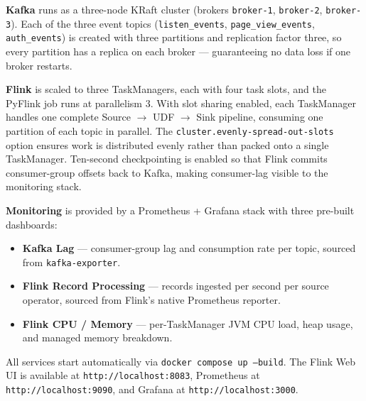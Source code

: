 \textbf{Kafka} runs as a three-node KRaft cluster (brokers \texttt{broker-1},
\texttt{broker-2}, \texttt{broker-3}).
Each of the three event topics (\texttt{listen\_events}, \texttt{page\_view\_events},
\texttt{auth\_events}) is created with three partitions and replication factor three,
so every partition has a replica on each broker — guaranteeing no data loss if one
broker restarts.

\textbf{Flink} is scaled to three TaskManagers, each with four task slots, and the
PyFlink job runs at parallelism 3.
With slot sharing enabled, each TaskManager handles one complete
Source $\to$ UDF $\to$ Sink pipeline, consuming one partition of each topic in parallel.
The \texttt{cluster.evenly-spread-out-slots} option ensures work is distributed evenly
rather than packed onto a single TaskManager.
Ten-second checkpointing is enabled so that Flink commits consumer-group offsets back to
Kafka, making consumer-lag visible to the monitoring stack.

\textbf{Monitoring} is provided by a Prometheus + Grafana stack with three pre-built
dashboards:
\begin{itemize}
  \item \textbf{Kafka Lag} — consumer-group lag and consumption rate per topic, sourced from \texttt{kafka-exporter}.
  \item \textbf{Flink Record Processing} — records ingested per second per source operator, sourced from Flink's native Prometheus reporter.
  \item \textbf{Flink CPU / Memory} — per-TaskManager JVM CPU load, heap usage, and managed memory breakdown.
\end{itemize}

All services start automatically via \texttt{docker compose up --build}.
The Flink Web UI is available at \texttt{http://localhost:8083},
Prometheus at \texttt{http://localhost:9090}, and
Grafana at \texttt{http://localhost:3000}.

